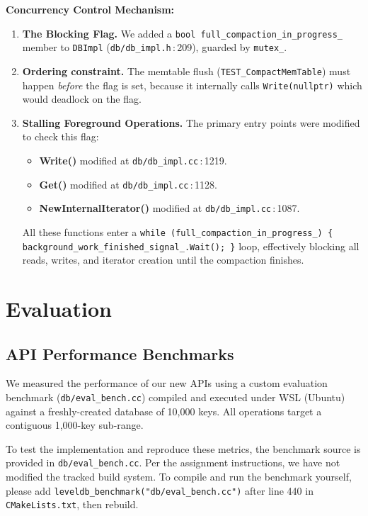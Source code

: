 \documentclass[11pt,a4paper]{article}
\newcommand{\codref}[2]{\textcolor{accent}{\texttt{\small#1}}\,$\!:\!$\textcolor{primary!70!black}{\small#2}}
\newcommand{\fname}[1]{\textcolor{primary!85!black}{\texttt{#1}}}
\begin{document}
\textbf{Concurrency Control Mechanism:}
\begin{enumerate}[leftmargin=1.6em,itemsep=4pt]
    \item \textbf{The Blocking Flag.} We added a \fname{bool full\_compaction\_in\_progress\_} member to \fname{DBImpl} (\codref{db/db\_impl.h}{209}), guarded by \fname{mutex\_}.
    \item \textbf{Ordering constraint.} The memtable flush (\fname{TEST\_CompactMemTable}) must happen \emph{before} the flag is set, because it internally calls \fname{Write(nullptr)} which would deadlock on the flag.
    \item \textbf{Stalling Foreground Operations.} The primary entry points were modified to check this flag:
    \begin{itemize}[itemsep=1pt]
        \item \textbf{Write()} modified at \codref{db/db\_impl.cc}{1219}.
        \item \textbf{Get()} modified at \codref{db/db\_impl.cc}{1128}.
        \item \textbf{NewInternalIterator()} modified at \codref{db/db\_impl.cc}{1087}.
    \end{itemize}
    All these functions enter a \lstinline|while (full_compaction_in_progress_) { background_work_finished_signal_.Wait(); }| loop, effectively blocking all reads, writes, and iterator creation until the compaction finishes.
\end{enumerate}

\section{Evaluation}\label{sec:eval}

\subsection{API Performance Benchmarks}

We measured the performance of our new APIs using a custom evaluation benchmark
(\fname{db/eval\_bench.cc}) compiled and executed under WSL (Ubuntu) against a
freshly-created database of 10{,}000 keys.  All operations target a contiguous
1{,}000-key sub-range.

\begin{designnote}
To test the implementation and reproduce these metrics, the benchmark source is provided in \fname{db/eval\_bench.cc}. Per the assignment instructions, we have not modified the tracked build system. To compile and run the benchmark yourself, please add \lstinline|leveldb_benchmark("db/eval_bench.cc")| after line 440 in \fname{CMakeLists.txt}, then rebuild.
\end{designnote}
\end{document}
